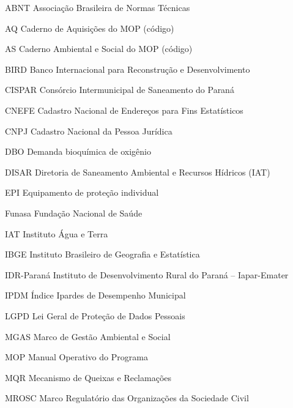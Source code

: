 \documentclass[12pt, oneside, a4paper, english, brazil]{abntex2}
\newcommand{\listofquadrosname}{Lista de quadros}
\begin{document}
\frenchspacing

\pretextual
\imprimirfolhaderosto

\listoffigures*
\cleardoublepage

\pdfbookmark[0]{\listofquadrosname}{loq}
\listofquadros*
\cleardoublepage

\listoftables*
\cleardoublepage

\begin{siglas}
  \item[ABNT] Associação Brasileira de Normas Técnicas
  \item[AQ] Caderno de Aquisições do MOP (código)
  \item[AS] Caderno Ambiental e Social do MOP (código)
  \item[BIRD] Banco Internacional para Reconstrução e Desenvolvimento
  \item[CISPAR] Consórcio Intermunicipal de Saneamento do Paraná
  \item[CNEFE] Cadastro Nacional de Endereços para Fins Estatísticos
  \item[CNPJ] Cadastro Nacional da Pessoa Jurídica
  \item[DBO] Demanda bioquímica de oxigênio
  \item[DISAR] Diretoria de Saneamento Ambiental e Recursos Hídricos (IAT)
  \item[EPI] Equipamento de proteção individual
  \item[Funasa] Fundação Nacional de Saúde
  \item[IAT] Instituto Água e Terra
  \item[IBGE] Instituto Brasileiro de Geografia e Estatística
  \item[IDR-Paraná] Instituto de Desenvolvimento Rural do Paraná – Iapar-Emater
  \item[IPDM] Índice Ipardes de Desempenho Municipal
  \item[LGPD] Lei Geral de Proteção de Dados Pessoais
  \item[MGAS] Marco de Gestão Ambiental e Social
  \item[MOP] Manual Operativo do Programa
  \item[MQR] Mecanismo de Queixas e Reclamações
  \item[MROSC] Marco Regulatório das Organizações da Sociedade Civil

\end{siglas}
\end{document}
